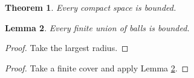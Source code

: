 \documentclass{article}
\newtheorem{theorem}{Theorem}
\newtheorem{lemma}[theorem]{Lemma}
\newcommand{\thmref}[1]{Theorem~\ref{#1}}
\begin{document}
\begin{theorem}\label{main} Every compact space is bounded. \end{theorem}
\begin{lemma}\label{aux} Every finite union of balls is bounded. \end{lemma}
\begin{proof} Take the largest radius. \end{proof}

\renewcommand{\proofname}{Proof of \thmref{main}}
\begin{proof} Take a finite cover and apply Lemma \ref{aux}. \end{proof}
\renewcommand{\proofname}{Proof}
\end{document}
